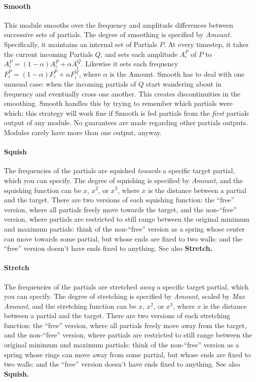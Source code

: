 \documentclass{article}
\begin{document}
\paragraph{Smooth} This module smooths over the frequency and amplitude differences between successive sets of partials.  The degree of smoothing is specified by {\it Amount}.  Specifically, it maintains an internal set of Partials \(P\).  At every timestep, it takes the current incoming Partials \(Q\), and sets each amplitude \(A^P_i\) of \(P\) to \(A^P_i = (1-\alpha) A^P_i + \alpha A^Q_i\).  Likewise it sets each frequency \(F^P_i = (1-\alpha) F^P_i + \alpha F^Q_i\), where \(\alpha\) is the Amount.  Smooth has to deal with one unusual case: when the incoming partials of \(Q\) start wandering about in frequency and eventually cross one another.  This creates discontinuities in the smoothing.  Smooth handles this by trying to remember which partials were which; this strategy will work fine if Smooth is fed partials from the {\it first} partials output of any module.  No guarantees are made regarding other partials outputs.  Modules rarely have more than one output, anyway.

\paragraph{Squish} The frequencies of the partials are squished {\it towards} a specific target partial, which you can specify.  The degree of squishing is specified by {\it Amount}, and the squishing function can be \(x\), \(x^2\), or \(x^3\), where \(x\) is the distance between a partial and the target.  There are two versions of each squishing function: the ``free'' version, where all partials freely move towards the target, and the non-``free'' version, where partials are restricted to still range between the original minimum and maximum partials: think of the non-``free'' version as a spring whose center can move towards some partial, but whose ends are fixed to two walls: and the ``free'' version doesn't have ends fixed to anything.  See also  {\bf Stretch.}

\paragraph{Stretch} The frequencies of the partials are stretched {\it away} a specific target partial, which you can specify.  The degree of stretching is specified by {\it Amount}, scaled by {\it Max Amount}, and the stretching function can be \(x\), \(x^2\), or \(x^3\), where \(x\) is the distance between a partial and the target.  There are two versions of each stretching function: the ``free'' version, where all partials freely move away from the target, and the non-``free'' version, where partials are restricted to still range between the original minimum and maximum partials: think of the non-``free'' version as a spring whose rings can move away from some partial, but whose ends are fixed to two walls: and the ``free'' version doesn't have ends fixed to anything.  See also  {\bf Squish.}
\end{document}

